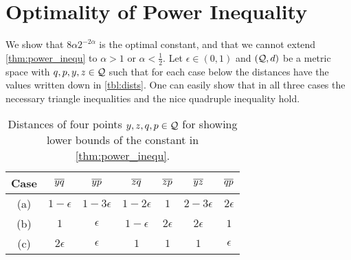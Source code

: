 \section{Optimality of Power Inequality}\label{app:power_inequ_opti}
%
We show that $8\alpha2^{-2\alpha}$ is the optimal constant, and that we cannot extend \autoref{thm:power_inequ} to $\alpha > 1$ or $\alpha < \frac12$.
Let $\epsilon\in(0,1)$ and $(\mathcal{Q}, d)$ be a metric space with $q,p,y,z\in\mathcal{Q}$ such that for each case below the distances have the values written down in \autoref{tbl:dists}. One can easily show that in all three cases the necessary triangle inequalities and the nice quadruple inequality hold.
%
\begin{table}
\begin{center}
\begin{tabular}{c||c|c|c|c|c|c}
	 Case&$\overline{yq}$ & $\overline{yp}$ & $\overline{zq}$ & $\overline{zp}$ & $\overline{yz}$ & $\overline{qp}$  \\ 
	\hline 
	\hline 
	 (a) &$1-\epsilon$ & $1-3\epsilon$ & $1-2\epsilon$ & $1$ & $2-3\epsilon$ & $2\epsilon$\\
	 \hline 
	 (b) & $1$ & $\epsilon$ & $1-\epsilon$ & $2\epsilon$ & $2\epsilon$ & $1$\\
	 \hline 
	 (c) & $2\epsilon$ & $\epsilon$ & $1$ & $1$ & $1$ & $\epsilon$ \\
\end{tabular}
\caption{Distances of four points $y,z,q,p\in\mathcal{Q}$ for showing lower bounds of the constant in \autoref{thm:power_inequ}.}
\label{tbl:dists}
\end{center}
\end{table}
%

